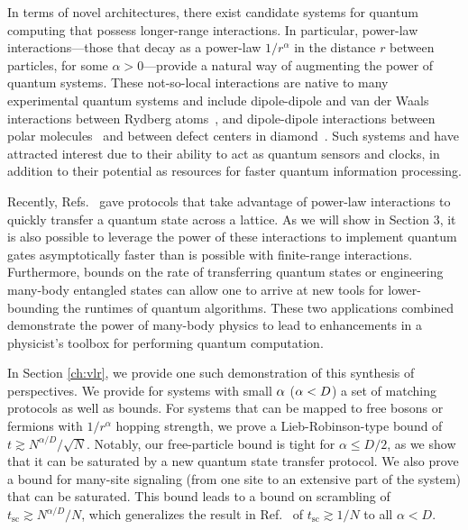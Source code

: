 In terms of novel architectures, there exist candidate systems for quantum computing that possess longer-range interactions.
In particular, power-law interactions---those that decay as a power-law $1/r^\alpha$ in the distance  $r$ between particles, for some $\alpha > 0$---provide a natural way of augmenting the power of quantum systems.
These not-so-local interactions are native to many experimental quantum systems and include dipole-dipole and van der Waals interactions between Rydberg atoms~\cite{Saffman2010,Weimer2012}, and dipole-dipole interactions between polar molecules~\cite{Yan2013} and between defect centers in diamond~\cite{Yao2012,Weimer2012}.
Such systems and have attracted interest due to their ability to act as quantum sensors and clocks, in addition to their potential as resources for faster quantum information processing.

Recently, Refs.~\cite{Eldredge2017,Guo2020,Tran2021a,kuwaharaStrictlyLinearLight2020} gave protocols that take advantage of power-law interactions to quickly transfer a quantum state across a lattice.
As we will show in Section 3, it is also possible to leverage the power of these interactions to implement quantum gates asymptotically faster than is possible with finite-range interactions.
Furthermore, bounds on the rate of transferring quantum states or engineering many-body entangled states can allow one to arrive at new tools for lower-bounding the runtimes of quantum algorithms.
These two applications combined demonstrate the power of many-body physics to lead to enhancements in a physicist's toolbox for performing quantum computation.

In Section \cref{ch:vlr}, we provide one such demonstration of this synthesis of perspectives. We provide for systems with small $\alpha$ ($\alpha < D$) a set of matching protocols as well as bounds. For systems that can be mapped to free bosons or fermions with $1/r^{\alpha}$ hopping strength, we prove a Lieb-Robinson-type bound of $t \gtrsim N^{\alpha/D}/\sqrt{N}$. Notably, our free-particle bound is tight for $\alpha\le D/2$, as we show that it can be saturated by a new quantum state transfer protocol. We also prove a bound for many-site signaling (from one site to an extensive part of the system) that can be saturated. This bound leads to a bound on scrambling of $t_\text{sc}\gtrsim N^{\alpha/D}/N$, which generalizes the result in Ref.~\cite{Lashkari13} of $t_\text{sc} \gtrsim 1/N$ to all $\alpha<D$.

